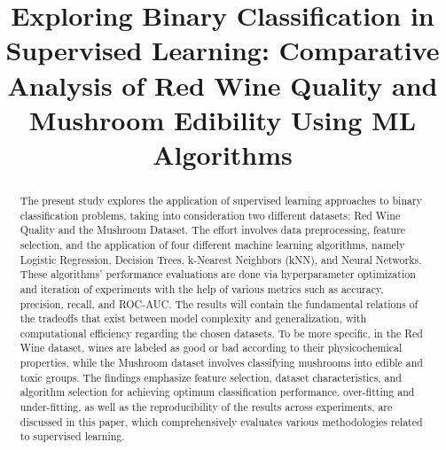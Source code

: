 \documentclass[conference]{IEEEtran}
\begin{document}
\title{Exploring Binary Classification in Supervised Learning: Comparative Analysis of Red Wine Quality and Mushroom Edibility Using ML Algorithms}

\author{
\and
{}
\and
{}
\and
{}
}

\maketitle

\begin{abstract}
  The present study explores the application of supervised learning approaches to binary classification problems, taking into consideration two different datasets: Red Wine Quality and the Mushroom Dataset. The effort involves data preprocessing, feature selection, and the application of four different machine learning algorithms, namely Logistic Regression, Decision Trees, k-Nearest Neighbors (kNN), and Neural Networks. These algorithms' performance evaluations are done via hyperparameter optimization and iteration of experiments with the help of various metrics such as accuracy, precision, recall, and ROC-AUC. The results will contain the fundamental relations of the tradeoffs that exist between model complexity and generalization, with computational efficiency regarding the chosen datasets. To be more specific, in the Red Wine dataset, wines are labeled as good or bad according to their physicochemical properties, while the Mushroom dataset involves classifying mushrooms into edible and toxic groups. The findings emphasize feature selection, dataset characteristics, and algorithm selection for achieving optimum classification performance. over-fitting and under-fitting, as well as the reproducibility of the results across experiments, are discussed in this paper, which comprehensively evaluates various methodologies related to supervised learning.
\end{abstract}
\end{document}
